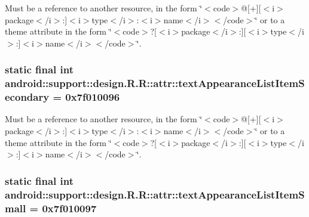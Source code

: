 Must be a reference to another resource, in the form \char`\"{}$<$code$>$@\mbox{[}+\mbox{]}\mbox{[}$<$i$>$package$<$/i$>$:\mbox{]}$<$i$>$type$<$/i$>$:$<$i$>$name$<$/i$>$$<$/code$>$\char`\"{} or to a theme attribute in the form \char`\"{}$<$code$>$?\mbox{[}$<$i$>$package$<$/i$>$:\mbox{]}\mbox{[}$<$i$>$type$<$/i$>$:\mbox{]}$<$i$>$name$<$/i$>$$<$/code$>$\char`\"{}. \hypertarget{classandroid_1_1support_1_1design_1_1_r_1_1attr_453f76edcad643bb4ffb984364ee045e}{
\subsubsection[{textAppearanceListItemSecondary}]{\setlength{\rightskip}{0pt plus 5cm}static final int android::support::design.R.R::attr::textAppearanceListItemSecondary = 0x7f010096}}
\label{classandroid_1_1support_1_1design_1_1_r_1_1attr_453f76edcad643bb4ffb984364ee045e}


Must be a reference to another resource, in the form \char`\"{}$<$code$>$@\mbox{[}+\mbox{]}\mbox{[}$<$i$>$package$<$/i$>$:\mbox{]}$<$i$>$type$<$/i$>$:$<$i$>$name$<$/i$>$$<$/code$>$\char`\"{} or to a theme attribute in the form \char`\"{}$<$code$>$?\mbox{[}$<$i$>$package$<$/i$>$:\mbox{]}\mbox{[}$<$i$>$type$<$/i$>$:\mbox{]}$<$i$>$name$<$/i$>$$<$/code$>$\char`\"{}. \hypertarget{classandroid_1_1support_1_1design_1_1_r_1_1attr_1a12367aca6562fb1e2870bb73ef4190}{
\subsubsection[{textAppearanceListItemSmall}]{\setlength{\rightskip}{0pt plus 5cm}static final int android::support::design.R.R::attr::textAppearanceListItemSmall = 0x7f010097}}
\label{classandroid_1_1support_1_1design_1_1_r_1_1attr_1a12367aca6562fb1e2870bb73ef4190}


